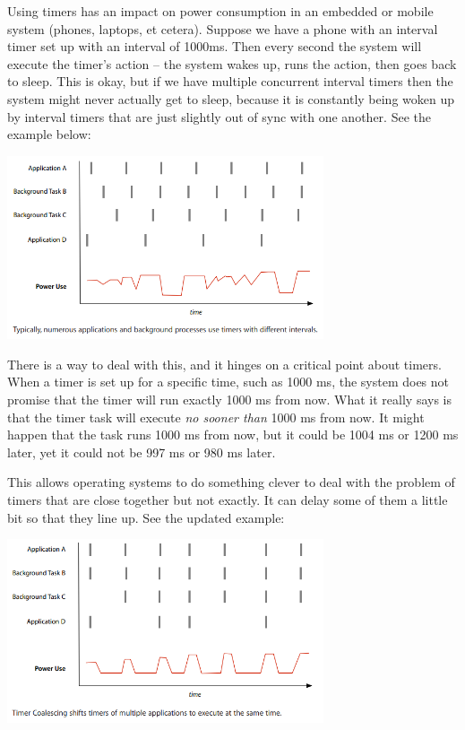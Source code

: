 Using timers has an impact on power consumption in an embedded or mobile system (phones, laptops, et cetera). Suppose we have a phone with an interval timer set up with an interval of 1000ms. Then every second the system will execute the timer's action -- the system wakes up, runs the action, then goes back to sleep. This is okay, but if we have multiple concurrent interval timers then the system might never actually get to sleep, because it is constantly being woken up by interval timers that are just slightly out of sync with one another. See the example below:

\begin{center}
	\includegraphics[width=0.7\textwidth]{images/coalesced_before.png}
	\cite{coalesce}
\end{center}

There is a way to deal with this, and it hinges on a critical point about timers. When a timer is set up for a specific time, such as 1000 ms, the system does not promise that the timer will run exactly 1000 ms from now. What it really says is that the timer task will execute \textit{no sooner than} 1000 ms from now. It might happen that the task runs 1000 ms from now, but it could be 1004 ms or 1200 ms later, yet it could not be 997 ms or 980 ms later.

This allows operating systems to do something clever to deal with the problem of timers that are close together but not exactly. It can delay some of them a little bit so that they line up. See the updated example:

\begin{center}
	\includegraphics[width=0.7\textwidth]{images/coalesced-after.png}
	\cite{coalesce}
\end{center}

